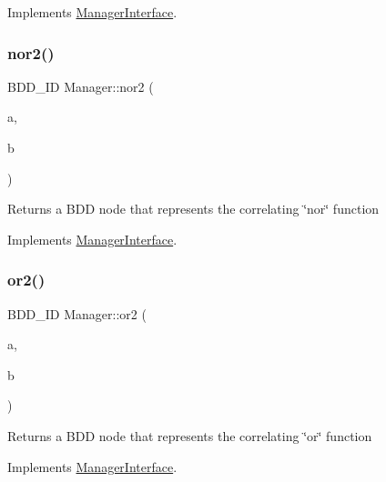 Implements \hyperlink{classManagerInterface_af7c4261f0ae260de651909790d505555}{Manager\+Interface}.

\mbox{\label{classManager_a1cbba8dc08a8c1bbabce0b98a8fde3be}} 
\subsubsection{\texorpdfstring{nor2()}{nor2()}}
{\footnotesize\ttfamily B\+D\+D\+\_\+\+ID Manager\+::nor2 (\begin{DoxyParamCaption}\item[{const B\+D\+D\+\_\+\+ID}]{a,  }\item[{const B\+D\+D\+\_\+\+ID}]{b }\end{DoxyParamCaption})\hspace{0.3cm}{\ttfamily [virtual]}}

\begin{DoxyReturn}{Returns}
a B\+DD node that represents the correlating \char`\"{}nor\char`\"{} function 
\end{DoxyReturn}


Implements \hyperlink{classManagerInterface_ad7d0582df3df84dbb06930c6e3ac5d72}{Manager\+Interface}.

\mbox{\label{classManager_a0f415b7af83a3efb6f7020650e68f1c3}} 
\subsubsection{\texorpdfstring{or2()}{or2()}}
{\footnotesize\ttfamily B\+D\+D\+\_\+\+ID Manager\+::or2 (\begin{DoxyParamCaption}\item[{const B\+D\+D\+\_\+\+ID}]{a,  }\item[{const B\+D\+D\+\_\+\+ID}]{b }\end{DoxyParamCaption})\hspace{0.3cm}{\ttfamily [virtual]}}

\begin{DoxyReturn}{Returns}
a B\+DD node that represents the correlating \char`\"{}or\char`\"{} function 
\end{DoxyReturn}


Implements \hyperlink{classManagerInterface_abb14ac782d5527eb5dad1c1a456f6c5e}{Manager\+Interface}.

